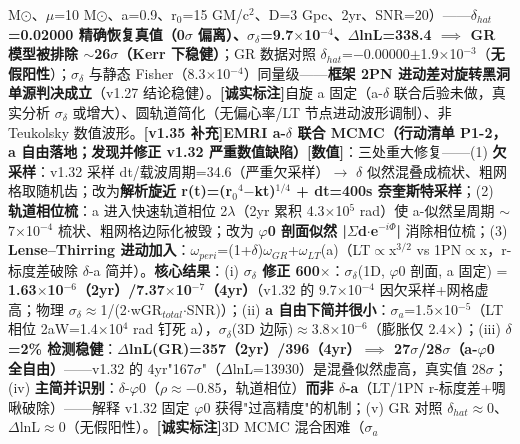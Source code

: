 \documentclass[12pt]{article}
\newcommand{\mtag}[1]{\textbf{[#1]}}
\newcommand{\up}[1]{\ensuremath{^{#1}}}
\newcommand{\down}[1]{\ensuremath{_{#1}}}
\begin{document}
M\ensuremath{\odot}、\ensuremath{\mu}=10 M\ensuremath{\odot}、a=0.9、r\down{0}=15 GM/c\up{2}、D=3 Gpc、2yr、SNR=20）------\textbf{\ensuremath{\delta}\down{hat}=0.02000 精确恢复真值（0\ensuremath{\sigma} 偏离）、\ensuremath{\sigma}\down{\delta{}}=9.7\ensuremath{\times}10\up{-4}、\ensuremath{\Delta}lnL=338.4 \ensuremath{\implies} GR 模型被排除 \ensuremath{\sim}26\ensuremath{\sigma}（Kerr 下稳健）}；GR 数据对照 \ensuremath{\delta}\down{hat}=\ensuremath{-}0.00000\ensuremath{\pm}1.9\ensuremath{\times}10\up{-3}（\textbf{无假阳性}）；\ensuremath{\sigma}\down{\delta{}} 与静态 Fisher（8.3\ensuremath{\times}10\up{-4}）同量级------\textbf{框架 2PN 进动差对旋转黑洞单源判决成立}（v1.27 结论稳健）。\mtag{诚实标注}自旋 a 固定（a-\ensuremath{\delta} 联合后验未做，真实分析 \ensuremath{\sigma}\down{\delta{}} 或增大）、圆轨道简化（无偏心率/LT 节点进动波形调制）、非 Teukolsky 数值波形。\textbf{\mtag{v1.35 补充}EMRI a-\ensuremath{\delta} 联合 MCMC（行动清单 P1-2，a 自由落地；发现并修正 v1.32 严重数值缺陷）}\mtag{数值}：三处重大修复------(1) \textbf{欠采样}：v1.32 采样 dt/载波周期=34.6（严重欠采样）\ensuremath{\to} \ensuremath{\delta} 似然混叠成梳状、粗网格取随机齿；改为\textbf{解析旋近 r(t)=(r\down{0}\up{4}\ensuremath{-}kt)\up{1/4} + dt=400s 奈奎斯特采样}；(2) \textbf{轨道相位梳}：a 进入快速轨道相位 2\ensuremath{\lambda}（2yr 累积 4.3\ensuremath{\times}10\up{5} rad）使 a-似然呈周期 \ensuremath{\sim}7\ensuremath{\times}10\up{-4} 梳状、粗网格边际化被毁；改为 \textbf{\ensuremath{\varphi}0 剖面似然 |\ensuremath{\Sigma}d\ensuremath{\cdot}e\up{-i\Phi{}}|} 消除相位梳；(3) \textbf{Lense--Thirring 进动加入}：\ensuremath{\omega}\down{peri}=(1+\ensuremath{\delta})\ensuremath{\omega}\down{GR}+\ensuremath{\omega}\down{LT}(a)（LT\ensuremath{\propto}x\up{3/2} vs 1PN\ensuremath{\propto}x，r-标度差破除 \ensuremath{\delta}-a 简并）。\textbf{核心结果}：(i) \textbf{\ensuremath{\sigma}\down{\delta{}} 修正 600\ensuremath{\times}}：\ensuremath{\sigma}\down{\delta{}}(1D, \ensuremath{\varphi}0 剖面, a 固定) = \textbf{1.63\ensuremath{\times}10\up{-6}（2yr）/7.37\ensuremath{\times}10\up{-7}（4yr）}（v1.32 的 9.7\ensuremath{\times}10\up{-4} 因欠采样+网格虚高；物理 \ensuremath{\sigma}\down{\delta{}}\ensuremath{\approx}1/(2\ensuremath{\cdot}wGR\down{total}\ensuremath{\cdot}SNR)）；(ii) \textbf{a 自由下简并很小}：\ensuremath{\sigma}\down{a}=1.5\ensuremath{\times}10\up{-5}（LT 相位 2aW=1.4\ensuremath{\times}10\up{4} rad 钉死 a），\ensuremath{\sigma}\down{\delta{}}(3D 边际)\ensuremath{\approx}3.8\ensuremath{\times}10\up{-6}（膨胀仅 2.4\ensuremath{\times}）；(iii) \textbf{\ensuremath{\delta}=2\% 检测稳健}：\textbf{\ensuremath{\Delta}lnL(GR)=357（2yr）/396（4yr）\ensuremath{\implies} 27\ensuremath{\sigma}/28\ensuremath{\sigma}（a-\ensuremath{\varphi}0 全自由）}------v1.32 的 4yr"167\ensuremath{\sigma}"（\ensuremath{\Delta}lnL=13930）是混叠似然虚高，真实值 28\ensuremath{\sigma}；(iv) \textbf{主简并识别}：\ensuremath{\delta}-\ensuremath{\varphi}0（\ensuremath{\rho}\ensuremath{\approx}\ensuremath{-}0.85，轨道相位）\textbf{而非 \ensuremath{\delta}-a}（LT/1PN r-标度差+啁啾破除）------解释 v1.32 固定 \ensuremath{\varphi}0 获得"过高精度"的机制；(v) GR 对照 \ensuremath{\delta}\down{hat}\ensuremath{\approx}0、\ensuremath{\Delta}lnL\ensuremath{\approx}0（无假阳性）。\mtag{诚实标注}3D MCMC 混合困难（\ensuremath{\sigma}\down{a} 
\end{document}
